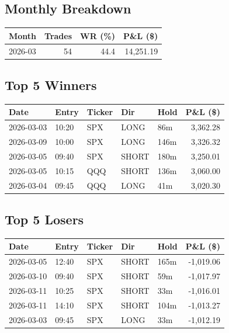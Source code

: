 \documentclass[11pt,a4paper,twoside]{article}
\begin{document}
\subsection{Monthly Breakdown}
\noindent\begin{center}
\begin{tabular}{>{\color{txtmain}}l rrr}
\toprule
\rowcolor{cardbg}
\textbf{Month} & \textbf{Trades} & \textbf{WR (\%)} & \textbf{P\&L (\$)} \\
\midrule
2026-03 & 54 & 44.4 & \textcolor{wingreen}{14,251.19} \\
\bottomrule
\end{tabular}
\end{center}
\subsection{Top 5 Winners}
\noindent\begin{center}
\begin{tabular}{>{\color{txtmain}}l llll r}
\toprule
\rowcolor{cardbg}
\textbf{Date} & \textbf{Entry} & \textbf{Ticker} & \textbf{Dir} & \textbf{Hold} & \textbf{P\&L (\$)} \\
\midrule
2026-03-03 & 10:20 & SPX & LONG & 86m & \textcolor{wingreen}{3,362.28} \\
2026-03-09 & 10:00 & SPX & LONG & 146m & \textcolor{wingreen}{3,326.32} \\
2026-03-05 & 09:40 & SPX & SHORT & 180m & \textcolor{wingreen}{3,250.01} \\
2026-03-05 & 10:15 & QQQ & SHORT & 136m & \textcolor{wingreen}{3,060.00} \\
2026-03-04 & 09:45 & QQQ & LONG & 41m & \textcolor{wingreen}{3,020.30} \\
\bottomrule
\end{tabular}
\end{center}
\subsection{Top 5 Losers}
\noindent\begin{center}
\begin{tabular}{>{\color{txtmain}}l llll r}
\toprule
\rowcolor{cardbg}
\textbf{Date} & \textbf{Entry} & \textbf{Ticker} & \textbf{Dir} & \textbf{Hold} & \textbf{P\&L (\$)} \\
\midrule
2026-03-05 & 12:40 & SPX & SHORT & 165m & \textcolor{lossred}{-1,019.06} \\
2026-03-10 & 09:40 & SPX & SHORT & 59m & \textcolor{lossred}{-1,017.97} \\
2026-03-11 & 10:25 & SPX & SHORT & 33m & \textcolor{lossred}{-1,016.01} \\
2026-03-11 & 14:10 & SPX & SHORT & 104m & \textcolor{lossred}{-1,013.27} \\
2026-03-03 & 09:45 & SPX & LONG & 33m & \textcolor{lossred}{-1,012.19} \\
\bottomrule
\end{tabular}
\end{center}
\clearpage
\end{document}

